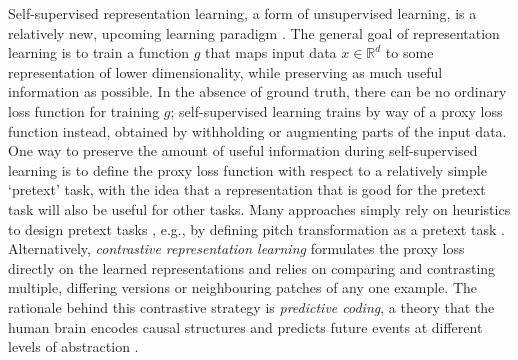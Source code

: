 Self-supervised representation learning, a form of unsupervised learning, is a relatively new, upcoming learning paradigm \cite{dosovitskiy2015discriminative, oord_representation_2019, hjelm_learning_2019,chen_simple_2020}.
The general goal of representation learning is to train a function $g$ that maps input data $x \in \mathbb{R}^d$ to some representation of lower dimensionality, while preserving as much useful information as possible.
In the absence of ground truth, there can be no ordinary loss function for training $g$; self-supervised learning trains by way of a proxy loss function instead, obtained by withholding or augmenting parts of the input data.
One way to preserve the amount of useful information during self-supervised learning is to define the proxy loss function with respect to a relatively simple `pretext' task, with the idea that a representation that is good for the pretext task will also be useful for other tasks.
Many approaches simply rely on heuristics to design pretext tasks \cite{doersch_unsupervised_2015,zhang2016colorful}, e.g., by defining pitch transformation as a pretext task \cite{spice}.
Alternatively, \emph{contrastive representation learning} formulates the proxy loss directly on the learned representations and relies on comparing and contrasting multiple, differing versions or neighbouring patches of any one example.
The rationale behind this contrastive strategy is \emph{predictive coding}, a theory that the human brain encodes causal structures and predicts future events at different levels of abstraction \cite{friston_predictive_2009}.



